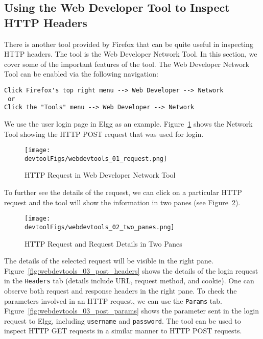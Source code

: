 \subsection{Using the Web Developer Tool to Inspect HTTP Headers}
\label{web:sec:web_dev_tools}


There is
another tool provided by Firefox that can be quite useful 
in inspecting HTTP headers. 
The tool is the Web Developer Network Tool.  In this
section, we cover some of the important features of the tool. 
The Web Developer Network Tool can be enabled via the following navigation: 


\begin{lstlisting}
Click Firefox's top right menu --> Web Developer --> Network
 or 
Click the "Tools" menu --> Web Developer --> Network 
\end{lstlisting}


We use the user login page in Elgg as an example. 
Figure~\ref{fig:webdevtools_01_request} shows the Network Tool showing the HTTP POST request
that was used for login.

\begin{figure}[htb]
\begin{center}
\texttt{[image: \\devtoolFigs/webdevtools\_01\_request.png]}
\end{center}
\caption{HTTP Request in Web Developer Network Tool}
\label{fig:webdevtools_01_request}
\end{figure}

To further see the details of the request, we can click on a particular HTTP request and the
tool will show the information in two panes (see Figure~\ref{fig:webdevtools_02_two_panes}). 

\begin{figure}[htb]
\begin{center}
	\texttt{[image: \\devtoolFigs/webdevtools\_02\_two\_panes.png]}
\end{center}
\caption{HTTP Request and Request Details in Two Panes}
\label{fig:webdevtools_02_two_panes}
\end{figure}



The details of the selected request will be visible in the right pane.
Figure~\ref{fig:webdevtools_03_post_headers} shows the details of the login request in the
\texttt{Headers} tab (details include URL, request method, and cookie). One can observe both
request and response headers in the right pane. To check the parameters involved in an HTTP
request, we can use the \texttt{Params} tab. Figure~\ref{fig:webdevtools_03_post_params} shows
the parameter sent in the login request to Elgg, including \texttt{username} and
\texttt{password}. The tool can be used to inspect HTTP GET requests in a similar manner to HTTP POST requests.

